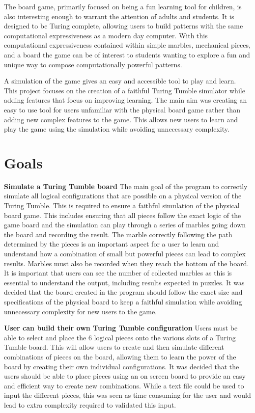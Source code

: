 \documentclass{l4proj}
\begin{document}
The board game, primarily focused on being a fun learning tool for children, is also interesting enough to warrant the attention of adults and students. It is designed to be Turing complete, allowing users to build patterns with the same computational expressiveness as a modern day computer. With this computational expressiveness contained within simple marbles, mechanical pieces, and a board the game can be of interest to students wanting to explore a fun and unique way to compose computationally powerful patterns.  

A simulation of the game gives an easy and accessible tool to play and learn. This project focuses on the creation of a faithful Turing Tumble simulator while adding features that focus on improving learning. The main aim was creating an easy to use tool for users unfamiliar with the physical board game rather than adding new complex features to the game. This allows new users to learn and play the game using the simulation while avoiding unnecessary complexity. 


\section{Goals}
\textbf{Simulate a Turing Tumble board} The main goal of the program to correctly simulate all logical configurations that are possible on a physical version of the Turing Tumble. This is required to ensure a faithful simulation of the physical board game. This includes ensuring that all pieces follow the exact logic of the game board and the simulation can play through a series of marbles going down the board and recording the result. The marble correctly following the path determined by the pieces is an important aspect for a user to learn and understand how a combination of small but powerful pieces can lead to complex results. Marbles must also be recorded when they reach the bottom of the board. It is important that users can see the number of collected marbles as this is essential to understand the output, including results expected in puzzles. It was decided that the board created in the program should follow the exact size and specifications of the physical board to keep a faithful simulation while avoiding unnecessary complexity for new users to the game.

\textbf{User can build their own Turing Tumble configuration} Users must be able to select and place the 6 logical pieces onto the various slots of a Turing Tumble board. This will allow users to create and then simulate different combinations of pieces on the board, allowing them to learn the power of the board by creating their own individual configurations. It was decided that the users should be able to place pieces using an on screen board to provide an easy and efficient way to create new combinations. While a text file could be used to input the different pieces, this was seen as time consuming for the user and would lead to extra complexity required to validated this input. 
\end{document}
